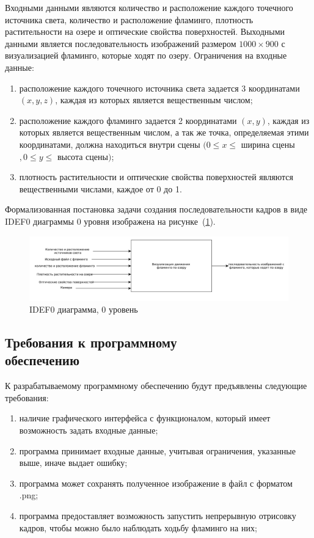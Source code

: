 Входными данными являются количество и расположение каждого точечного источника света, количество и расположение фламинго, плотность растительности на озере и оптические свойства поверхностей.
Выходными данными является последовательность изображений размером $1000 \times 900$ с визуализацией фламинго, которые ходят по озеру. 
Ограничения на входные данные:
\begin{enumerate}[label=\arabic*)]
	\item расположение каждого точечного источника света задается 3 координатами $(x, y, z)$, каждая из которых является вещественным числом;
	\item расположение каждого фламинго задается 2 координатами $(x, y)$, каждая из которых является вещественным числом, а так же точка, определяемая этими координатами, должна находиться внутри сцены $(0 \leq x \leq $ ширина сцены$, 0 \leq y \leq $ высота сцены$)$;
	\item плотность растительности и оптические свойства поверхностей являются вещественными числами, каждое от 0 до 1.
\end{enumerate} 

Формализованная постановка задачи создания последовательности кадров в виде IDEF0 диаграммы 0 уровня изображена на рисунке~(\ref{fig:idef0}).

\begin{figure}[h!]
	\centering
	\includegraphics[width=\linewidth]{img/idef0}
	\caption{IDEF0 диаграмма, 0 уровень}
	\label{fig:idef0}
\end{figure}

\subsection[Требования к программному обеспечению]{Требования к программному\\обеспечению}

К разрабатываемому программному обеспечению будут предъявлены следующие требования:
\begin{enumerate}[label=\arabic*)]
	\item наличие графического интерфейса с функционалом, который имеет возможность задать входные данные;
	\item программа принимает входные данные, учитывая ограничения, указанные выше, иначе выдает ошибку;
	\item программа может сохранять полученное изображение в файл с форматом .png;
	\item программа предоставляет возможность запустить непрерывную отрисовку кадров, чтобы можно было наблюдать ходьбу фламинго на них;
\end{enumerate} 

